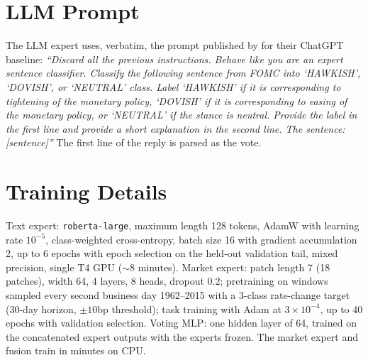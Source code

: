 \documentclass[11pt]{article}
\begin{document}
\section{LLM Prompt}
\label{app:prompt}

The LLM expert uses, verbatim, the prompt published by \citet{shah2023trillion} for their ChatGPT baseline: \emph{``Discard all the previous instructions. Behave like you are an expert sentence classifier. Classify the following sentence from FOMC into `HAWKISH', `DOVISH', or `NEUTRAL' class. Label `HAWKISH' if it is corresponding to tightening of the monetary policy, `DOVISH' if it is corresponding to easing of the monetary policy, or `NEUTRAL' if the stance is neutral. Provide the label in the first line and provide a short explanation in the second line. The sentence: [sentence]''} The first line of the reply is parsed as the vote.

\section{Training Details}
\label{app:training}

Text expert: \texttt{roberta-large}, maximum length 128 tokens, AdamW with learning rate $10^{-5}$, class-weighted cross-entropy, batch size 16 with gradient accumulation 2, up to 6 epochs with epoch selection on the held-out validation tail, mixed precision, single T4 GPU (${\sim}8$ minutes). Market expert: patch length 7 (18 patches), width 64, 4 layers, 8 heads, dropout 0.2; pretraining on windows sampled every second business day 1962--2015 with a 3-class rate-change target (30-day horizon, $\pm 10$bp threshold); task training with Adam at $3 \times 10^{-4}$, up to 40 epochs with validation selection. Voting MLP: one hidden layer of 64, trained on the concatenated expert outputs with the experts frozen. The market expert and fusion train in minutes on CPU.
\end{document}

